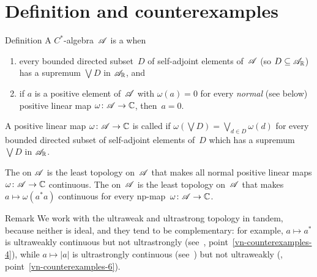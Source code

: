 \documentclass[a]{subfiles}
\begin{document}
\section{Definition and counterexamples}
\begin{parsec}[vna]%
\begin{point}{Definition}%
A $C^*$-algebra~$\mathscr{A}$
is a 
when
\begin{enumerate}
\item
every bounded directed subset~$D$
of self-adjoint elements of~$\mathscr{A}$ (so $D\subseteq \mathscr{A}_{\mathbb{R}}$) 
has a supremum $\bigvee D$ in $\mathscr{A}_{\mathbb{R}}$, and
\item
if $a$ is a positive element of~$\mathscr{A}$
with $\omega(a)=0$ for every \emph{normal} (see below) positive 
linear map $\omega\colon \mathscr{A}\to \mathbb{C}$,
then~$a=0$.
\end{enumerate}
\begin{point}%
A positive linear map $\omega\colon \mathscr{A}\to \mathbb{C}$
is called 
if $\omega(\bigvee D) = \bigvee_{d\in D} \omega(d)$
for every bounded directed subset of self-adjoint elements of~$D$
which has a supremum $\bigvee D$ in $\mathscr{A}_{\mathbb{R}}$.
\end{point}%
\begin{point}%
The  on $\mathscr{A}$
is the least topology on~$\mathscr{A}$
that makes all normal positive linear maps $\omega\colon \mathscr{A}\to \mathbb{C}$
continuous.
The  on~$\mathscr{A}$
is the least topology on~$\mathscr{A}$
that makes $a\mapsto \omega(a^*a)$ continuous
for every np-map~$\omega\colon \mathscr{A}\to \mathbb{C}$.
\end{point}
\end{point}
\begin{point}{Remark}%
We work with the ultraweak and ultrastrong topology in tandem,
because neither is ideal, and they tend to be complementary:
for example, $a\mapsto a^*$ is ultraweakly continuous
but not ultrastrongly (see~,
point~\ref{vn-counterexamples-4}), 
while $a\mapsto \left|a\right|$
is ultrastrongly continuous (see~)
but not ultraweakly (, 
point~\ref{vn-counterexamples-6}).


\end{point}
\end{parsec}
\end{document}
